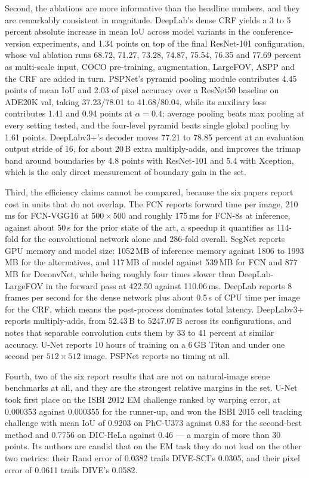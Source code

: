 \documentclass[journal]{IEEEtran}
\begin{document}
Second, the ablations are more informative than the headline numbers, and they are
remarkably consistent in magnitude. DeepLab's dense CRF yields a 3 to 5 percent
absolute increase in mean IoU across model variants in the conference-version
experiments, and 1.34 points on top of the final ResNet-101 configuration, whose val
ablation runs 68.72, 71.27, 73.28, 74.87, 75.54, 76.35 and 77.69 percent as
multi-scale input, COCO pre-training, augmentation, LargeFOV, ASPP and the CRF are
added in turn. PSPNet's pyramid pooling module contributes 4.45 points of mean IoU and
2.03 of pixel accuracy over a ResNet50 baseline on ADE20K val, taking 37.23/78.01 to
41.68/80.04, while its auxiliary loss contributes 1.41 and 0.94 points at
$\alpha=0.4$; average pooling beats max pooling at every setting tested, and the
four-level pyramid beats single global pooling by 1.61 points. DeepLabv3+'s decoder
moves 77.21 to 78.85 percent at an evaluation output stride of 16, for about 20\,B
extra multiply-adds, and improves the trimap band around boundaries by 4.8 points with
ResNet-101 and 5.4 with Xception, which is the only direct measurement of boundary
gain in the set.

Third, the efficiency claims cannot be compared, because the six papers report cost in
units that do not overlap. The FCN reports forward time per image, 210\,ms for
FCN-VGG16 at $500\times500$ and roughly 175\,ms for FCN-8s at inference, against about
50\,s for the prior state of the art, a speedup it quantifies as 114-fold for the
convolutional network alone and 286-fold overall. SegNet reports GPU memory and model
size: 1052\,MB of inference memory against 1806 to 1993\,MB for the alternatives, and
117\,MB of model against 539\,MB for FCN and 877\,MB for DeconvNet, while being
roughly four times slower than DeepLab-LargeFOV in the forward pass at 422.50 against
110.06\,ms. DeepLab reports 8 frames per second for the dense network plus about 0.5\,s
of CPU time per image for the CRF, which means the post-process dominates total
latency. DeepLabv3+ reports multiply-adds, from 52.43\,B to 5247.07\,B across its
configurations, and notes that separable convolution cuts them by 33 to 41 percent at
similar accuracy. U-Net reports 10 hours of training on a 6\,GB Titan and under one
second per $512\times512$ image. PSPNet reports no timing at all.

Fourth, two of the six report results that are not on natural-image scene benchmarks
at all, and they are the strongest relative margins in the set. U-Net took first place
on the ISBI 2012 EM challenge ranked by warping error, at 0.000353 against 0.000355 for
the runner-up, and won the ISBI 2015 cell tracking challenge with mean IoU of 0.9203 on
PhC-U373 against 0.83 for the second-best method and 0.7756 on DIC-HeLa against 0.46 ---
a margin of more than 30 points. Its authors are candid that on the EM task they do not
lead on the other two metrics: their Rand error of 0.0382 trails DIVE-SCI's 0.0305, and
their pixel error of 0.0611 trails DIVE's 0.0582.
\end{document}

